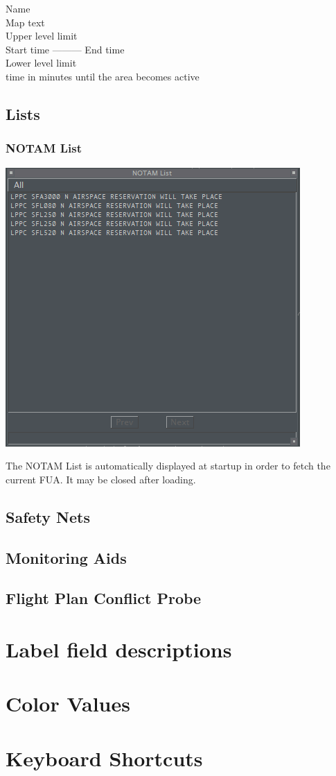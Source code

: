 \documentclass[11pt,a4paper,oldfontcommands]{memoir}
\begin{document}
\begin{center}
        Name\\ 
        Map text\\
        Upper level limit\\
        Start time --------- End time\\
        Lower level limit\\time in minutes until the area becomes active
\end{center}

\section{Lists}

\subsection{NOTAM List}
\label{list:notam}
\includegraphics{img/notamlist.png}

The NOTAM List is automatically displayed at startup in order to fetch the current FUA. It may be closed after loading.

\section{Safety Nets}

\section{Monitoring Aids}

\section{Flight Plan Conflict Probe}

\appendix

\chapter{Label field descriptions}

\chapter{Color Values}

\chapter{Keyboard Shortcuts}



\end{document}

